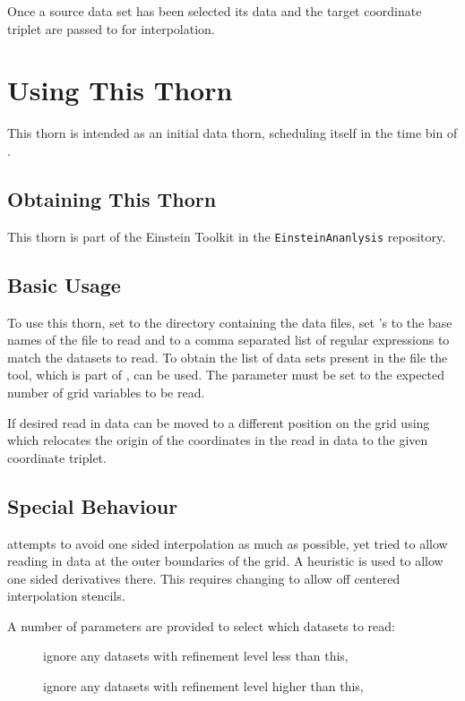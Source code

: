Once a source data set has been selected its data and the target coordinate
triplet are passed to  for interpolation.

\section{Using This Thorn}
This thorn is intended as an initial data thorn, scheduling itself in the
 time bin of .

\subsection{Obtaining This Thorn}
This thorn is part of the Einstein Toolkit in the \texttt{EinsteinAnanlysis}
repository.

\subsection{Basic Usage}
To use this thorn, set  to the directory
containing the data files, set 's  to the base
names of the file to read and  to a comma separated
list of regular expressions to match the datasets to read. To obtain the list
of data sets present in the file the  tool, which is part of
, can be used. The parameter
 must be set to the expected number of
grid variables to be read.

If desired read in data can be moved to a different position on the grid using
 which relocates the origin of the
coordinates in the read in data to the given coordinate triplet.

\subsection{Special Behaviour}
 attempts to avoid one sided interpolation as much as
possible, yet tried to allow reading in data at the outer boundaries of the
grid. A heuristic is used to allow one sided derivatives there.  This requires
changing  to allow off centered interpolation
stencils.

A number of parameters are provided to select which datasets to read:

\begin{description}
\item[] ignore any datasets with refinement level less
than this,
\item[] ignore any datasets with refinement level
higher than this,
\end{description}

